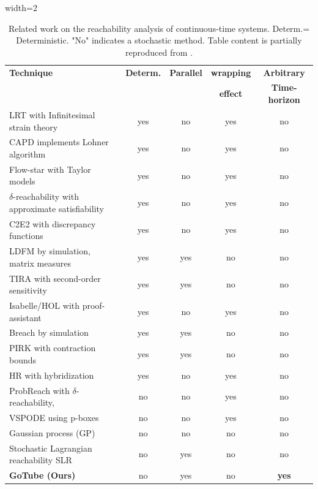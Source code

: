 \documentclass[letterpaper]{article} %
\begin{document}
\begin{table}[t]
\small
\centering
\caption{Related work on the reachability analysis of continuous-time systems. Determ.= Deterministic. "No" indicates a stochastic method. Table content is partially reproduced from \cite{Gruenbacher2021verification}.}
\begin{adjustbox}{width=2\columnwidth}
\begin{tabular}{l|c|c|c|c}
\toprule
\textbf{Technique} & \textbf{Determ.} & \textbf{Parallel} & \textbf{wrapping} & \textbf{Arbitrary }\\
 & &  & \textbf{effect} & \textbf{Time-horizon}\\
\midrule
LRT \cite{Cyranka2017} with Infinitesimal strain theory & yes & no & yes & no \\
CAPD \cite{capd} implements Lohner algorithm & yes & no &  yes & no  \\
Flow-star \cite{flowstar} with Taylor models & yes & no  & yes & no  \\
$\delta$-reachability \cite{deltadecidable} with approximate satisfiability & yes & no & yes & no \\
C2E2 \cite{c2e2} with discrepancy functions & yes & no  & yes & no \\
LDFM \cite{fansimul} by simulation, matrix measures & yes & yes  & no & no \\
TIRA \cite{tira} with second-order sensitivity & yes & yes & no & no \\
Isabelle/HOL \cite{isabelle} with proof-assistant & yes & no  & yes & no \\
Breach \cite{breach,donze} by simulation & yes & yes  & no & no \\
PIRK \cite{pirk} with contraction bounds & yes & yes & no & no \\
HR \cite{hr} with hybridization & yes & no & yes & no \\
ProbReach \cite{probreach2} with $\delta$-reachability,  & no & no  & yes & no \\
VSPODE \cite{reliablecomput} using p-boxes & no &no  & yes & no \\
Gaussian process (GP) \cite{gp} & no & no & no & no \\
Stochastic Lagrangian reachability SLR \cite{Gruenbacher2021verification} & no & yes & no & no \\
\textbf{GoTube (Ours)} & no & yes & no & \textbf{yes} \\
\bottomrule
\end{tabular}
\end{adjustbox}
 \label{tab:related_works}
\end{table}
\end{document}
